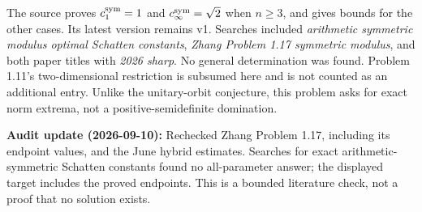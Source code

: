 \documentclass[11pt,a4paper]{article}
\begin{document}
The source proves \(c_1^{\rm sym}=1\) and \(c_\infty^{\rm sym}=\sqrt2\)
when \(n\ge3\), and gives bounds for the other cases. Its latest version
remains v1. Searches included
\textit{arithmetic symmetric modulus optimal Schatten constants},
\textit{Zhang Problem 1.17 symmetric modulus}, and both paper titles
with \textit{2026 sharp}. No general determination was found. Problem
1.11's two-dimensional restriction is subsumed here and is not counted
as an additional entry. Unlike the unitary-orbit conjecture, this
problem asks for exact norm extrema, not a positive-semidefinite
domination.

\textbf{Audit update (2026-09-10):} Rechecked Zhang Problem 1.17,
including its endpoint values, and the June hybrid estimates. Searches
for exact arithmetic-symmetric Schatten constants found no all-parameter
answer; the displayed target includes the proved endpoints. This is a
bounded literature check, not a proof that no solution exists.
\end{document}
